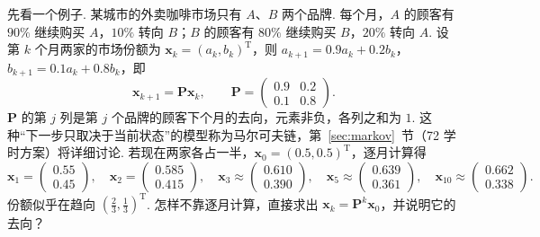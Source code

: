 \documentclass[lang=cn,10.5pt,scheme=chinese,toc=twocol,section,chinesefont=nofont,
twoside,citestyle=gb7714-2015,bibstyle=gb7714-2015]{elegantbook}
\newcommand{\vv}[1]{\boldsymbol{#1}}
\newcommand{\trans}{\mathrm{T}}             %
\numberwithin{equation}{section}   %
\begin{document}
先看一个例子. 某城市的外卖咖啡市场只有 $A$、$B$ 两个品牌. 每个月，$A$ 的顾客有 $90\%$ 继续购买 $A$，$10\%$ 转向 $B$；$B$ 的顾客有 $80\%$ 继续购买 $B$，$20\%$ 转向 $A$. 设第 $k$ 个月两家的市场份额为 $\vv x_k=(a_k,b_k)^\trans$，则 $a_{k+1}=0.9a_k+0.2b_k$，$b_{k+1}=0.1a_k+0.8b_k$，即
\begin{equation}
  \label{eq:markov2}
  \vv x_{k+1}=\vv P\vv x_k,\qquad \vv P=
                                        \begin{pmatrix}
                                          0.9 & 0.2 \\0.1&0.8
                                        \end{pmatrix}
  .
\end{equation}
$\vv P$ 的第 $j$ 列是第 $j$ 个品牌的顾客下个月的去向，元素非负，各列之和为 $1$. 这种“下一步只取决于当前状态”的模型称为马尔可夫链，第~\ref{sec:markov}~节（72 学时方案）将详细讨论.%
若现在两家各占一半，$\vv x_0=(0.5,0.5)^\trans$，逐月计算得
\[
  \vv x_1=
  \begin{pmatrix}
    0.55 \\0.45
  \end{pmatrix}
  ,\quad \vv x_2=
  \begin{pmatrix}
    0.585 \\0.415
  \end{pmatrix}
  ,\quad \vv x_3\approx
  \begin{pmatrix}
    0.610 \\0.390
  \end{pmatrix}
  ,\quad \vv x_5\approx
  \begin{pmatrix}
    0.639 \\0.361
  \end{pmatrix}
  ,\quad \vv x_{10}\approx
  \begin{pmatrix}
    0.662 \\0.338
  \end{pmatrix}
  .
\]
份额似乎在趋向 $(\frac23,\frac13)^\trans$. 怎样不靠逐月计算，直接求出 $\vv x_k=\vv P^k\vv x_0$，并说明它的去向？
\end{document}
